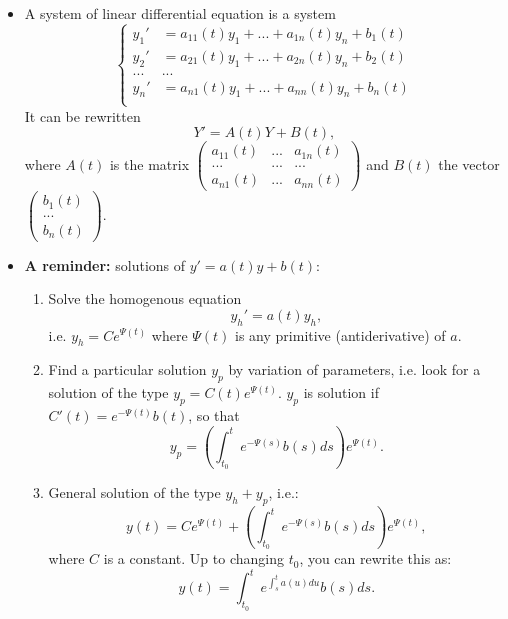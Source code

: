 
\begin{itemize}
\item A system of linear differential equation is a system
\[\left\{ \begin{split} 
y_1' & = a_{11}(t) y_1 + ... + a_{1n}(t) y_n + b_1(t) \\
y_2' & = a_{21}(t) y_1 + ... + a_{2n}(t) y_n + b_2(t) \\ 
... & ... \\
y_n' & = a_{n1}(t) y_1 + ... + a_{nn}(t) y_n + b_n(t) \\
\end{split} \right. \]
It can be rewritten \[Y' = A(t)Y +B(t),\]
where $A(t)$ is the matrix $\begin{pmatrix} a_{11}(t) & ... & a_{1n}(t) \\
						...	& ...  & ... \\
                                            a_{n1}(t) & ... & a_{nn}(t) \end{pmatrix}$ and $B(t)$ the vector $\begin{pmatrix} b_1(t) \\ ... \\ b_n(t)\end{pmatrix}$.

\item \textbf{A reminder:} solutions of $y' = a(t)y + b(t)$:  
\begin{enumerate}
\item Solve the homogenous equation \[y_h'=a(t)y_h,\] 
i.e. $y_h=Ce^{\Psi(t)}$ where $\Psi(t)$ is any primitive (antiderivative) of $a$. 
\item Find a particular solution $y_p$ by variation of parameters, i.e. look for a solution of the type $y_p=C(t)e^{\Psi(t)}$. $y_p$ is solution if $C'(t)= e^{-\Psi (t)}b(t)$, so that \[y_p = (\int_{t_0}^t e^{-\Psi (s)}b(s)ds ) e^{\Psi(t)}.\]
\item General solution of the type $y_h+y_p$, i.e.:
\[y(t) = Ce^{\Psi(t)} + (\int_{t_0}^t e^{-\Psi (s)}b(s)ds ) e^{\Psi(t)},\]
where $C$ is a constant.
Up to changing $t_0$, you can rewrite this as:
\[y(t) = \int_{t_0}^t e^{ \int_s^t a(u) du}b(s)ds .\]
\end{enumerate}


\end{itemize}
